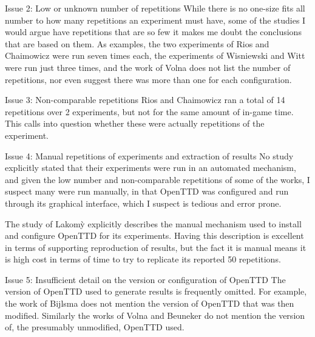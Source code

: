 \documentclass[logo,msc,dsti]{style/infthesis}    %
\begin{document}
{\begin{itemize}
\begin{descitem}{Issue 2: Low or unknown number of repetitions}
While there is no one-size fits all number to how many repetitions an experiment must have, some of the studies I would argue have repetitions that are so few it makes me doubt the conclusions that are based on them. As examples, the two experiments of Rios and Chaimowicz \cite{rios2009trains} were run seven times each, the experiments of Wisniewski and Witt \cite{wisniewski2011artificial} were run just three times, and the work of Volna \cite{volna2017fuzzy} does not list the number of repetitions, nor even suggest there was more than one for each configuration.
\end{descitem}
\begin{descitem}{Issue 3: Non-comparable repetitions}
Rios and Chaimowicz \cite{rios2009trains} ran a total of 14 repetitions over 2 experiments, but not for the same amount of in-game time. This calls into question whether these were actually repetitions of the experiment.
\end{descitem}
\begin{descitem}{Issue 4: Manual repetitions of experiments and extraction of results}
No study explicitly stated that their experiments were run in an automated mechanism, and given the low number and non-comparable repetitions of some of the works, I suspect many were run manually, in that OpenTTD was configured and run through its graphical interface, which I suspect is tedious and error prone.

The study of {Lakom{\`y}} \cite{lakomy2020railroad} explicitly describes the manual mechanism used to install and configure OpenTTD for its experiments. Having this description is excellent in terms of supporting reproduction of results, but the fact it is manual means it is high cost in terms of time to try to replicate its reported 50 repetitions.
\end{descitem}

\begin{descitem}{Issue 5: Insufficient detail on the version or configuration of OpenTTD}
The version of OpenTTD used to generate results is frequently omitted. For example, the work of Bijlsma \cite{bijlsma2014evolving} does not mention the version of OpenTTD that was then modified. Similarly the works of Volna \cite{volna2017fuzzy} and Beuneker \cite{beuneker2019autonomous} do not mention the version of, the presumably unmodified, OpenTTD used.


\end{descitem}
\end{itemize}}
\end{document}
